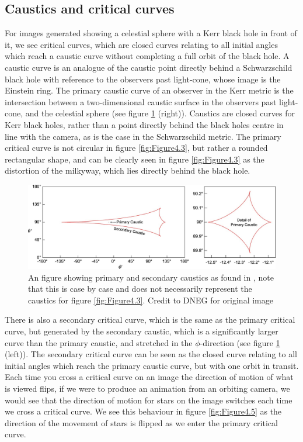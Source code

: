 \documentclass[oneside,openright,frontopenright, singlespacing]{dmathesis}
\begin{document}
\subsection{Caustics and critical curves}\label{subsec:Subsection4.8.2}

\vspace{1em}
	For images generated showing a celestial sphere with a Kerr black hole in front of it, we see critical curves, which are closed curves relating to all initial angles which reach a caustic curve without completing a full orbit of the black hole. A caustic curve is an analogue of the caustic point directly behind a Schwarzschild black hole with reference to the observers past light-cone, whose image is the Einstein ring. The primary caustic curve of an observer in the Kerr metric is the intersection between a two-dimensional caustic surface in the observers past light-cone, and the celestial sphere (see figure \ref{fig:Figure4.4} (right)). Caustics are closed curves for Kerr black holes, rather than a point directly behind the black holes centre in line with the camera, as is the case in the Schwarzschild metric. The primary critical curve is not circular in figure \ref{fig:Figure4.3}, but rather a rounded rectangular shape, and can be clearly seen in figure \ref{fig:Figure4.3} as the distortion of the milkyway, which lies directly behind the black hole.

\vspace{1em}
\begin{figure}[!ht]
	\centering
	\includegraphics[width=0.87\linewidth]{img/caustic0}
	\caption{An figure showing primary and secondary caustics as found in \cite{thorne2015gravitational}, note that this is case by case and does not necessarily represent the caustics for figure \ref{fig:Figure4.3}. Credit to DNEG for original image}
	\label{fig:Figure4.4}
\end{figure}

\vspace{1em}
	There is also a secondary critical curve, which is the same as the primary critical curve, but generated by the secondary caustic, which is a significantly larger curve than the primary caustic, and stretched in the $\phi$-direction (see figure \ref{fig:Figure4.4} (left)). The secondary critical curve can be seen as the closed curve relating to all initial angles which reach the primary caustic curve, but with one orbit in transit. Each time you cross a critical curve on an image the direction of motion of what is viewed flips, if we were to produce an animation from an orbiting camera, we would see that the direction of motion for stars on the image switches each time we cross a critical curve. We see this behaviour in figure \ref{fig:Figure4.5} as the direction of the movement of stars is flipped as we enter the primary critical curve.
\end{document}
